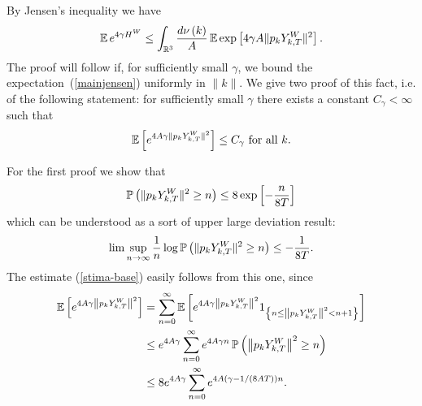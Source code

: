 By Jensen's
inequality we have
\begin{equation}
\begin{split}
\operatorname{{\mathbb E}} e^{4 \gamma H^W} \leq \int_{\mathbb{R}^3} 
\frac{d\nu \left( k\right)}{A} \operatorname{{\mathbb E}} 
\exp \left[ 4 \gamma A\|
  p_k Y^W_{k,T}\|^2 \right].
\end{split}
\label{mainjensen}
\end{equation}
The proof will follow if, for sufficiently small $\gamma$, we bound
the expectation~(\ref{mainjensen}) uniformly in $\|k\|$. 
We give two proof of this fact, i.e.
of the following statement: for sufficiently small $\gamma$ there exists a
constant $C_{\gamma }<\infty $ such that 
\begin{equation}
\expect\left[ e^{4 A\gamma \| p_k Y^W_{k,T}\|^{2}}\right] \leq C_{\gamma }\text{ for all }%
k\text{.}  \label{stima-base}
\end{equation}

For the first proof we show that
\begin{equation}
\operatorname{{\mathbb P}}\left( \| p_k Y^W_{k,T} \|^{2}\geq n\right) 
\leq 8 \exp \left[ -\frac{n}{8T}\right]
\label{LDP2}
\end{equation}
which can be understood as a sort of upper large deviation result: 
\begin{equation}
\lim \sup_{n\rightarrow \infty }\frac{1}{n}\log \operatorname{{\mathbb P}}\left( \|p_k Y^W_{k,T}\|^{2}\geq
n\right) \leq -\frac{1}{8T}  \label{LDP}.
\end{equation}
The estimate (\ref{stima-base}) easily follows from this one, since 
\begin{equation*}
\begin{split}
\operatorname{{\mathbb E}}\left[ e^{4 A\gamma \left\| p_k Y^W_{k,T}\right\|^{2}}\right]
& =\sum_{n=0}^{\infty }\operatorname{{\mathbb E}}\left[ e^{4 A\gamma \left\|
      p_k Y^W_{k,T}\right\|^{2}}
1_{\left\{ n\leq \left\| p_k Y^W_{k,T}\right\|^{2}<n+1\right\} }\right] 
\\ &\leq e^{4 A\gamma }\sum_{n=0}^{\infty }e^{4 A\gamma n}\operatorname{{\mathbb P}}\left( \left\|
p_k Y^W_{k,T}\right\|^{2}\geq n\right) 
\\ &\leq 8 e^{4 A\gamma }\sum_{n=0}^{\infty }e^{4 A (\gamma - 1/(8AT))
  n}. 
\end{split}
\end{equation*}

